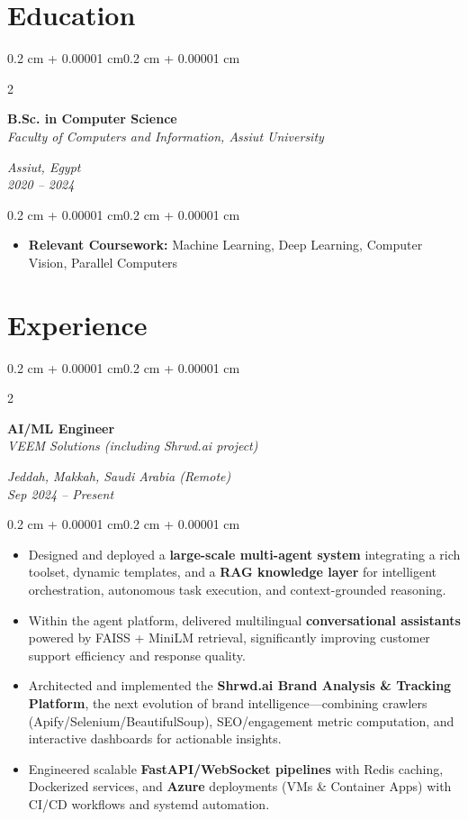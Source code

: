 \documentclass[10pt, letterpaper]{article}
\newenvironment{highlights}{
  \begin{itemize}[
    topsep=0.10 cm,
    parsep=0.10 cm,
    partopsep=0pt,
    itemsep=0pt,
    leftmargin=0.4 cm + 10pt
  ]}
  {\end{itemize}
}
\newenvironment{onecolentry}{
  \begin{adjustwidth}{0.2 cm + 0.00001 cm}{0.2 cm + 0.00001 cm}
}{
  \end{adjustwidth}
}
\newenvironment{twocolentry}[2][]{
  \onecolentry
  \def\secondColumn{#2}
  \setcolumnwidth{\fill, 4.5 cm}
  \begin{paracol}{2}
}{
  \switchcolumn \raggedleft \secondColumn
  \end{paracol}
  \endonecolentry
}
\begin{document}
\section{Education}
\begin{twocolentry}{
  \textit{Assiut, Egypt} \\
  \textit{2020 -- 2024}}
  \textbf{B.Sc. in Computer Science} \\
  \textit{Faculty of Computers and Information, Assiut University}
\end{twocolentry}
\vspace{0.10 cm}
\begin{onecolentry}
  \begin{highlights}
    \item \textbf{Relevant Coursework:} Machine Learning, Deep Learning, Computer Vision, Parallel Computers
  \end{highlights}
\end{onecolentry}

\section{Experience}

\begin{twocolentry}{
  \textit{Jeddah, Makkah, Saudi Arabia (Remote)} \\
  \textit{Sep 2024 -- Present}}
  \textbf{AI/ML Engineer} \\
  \textit{VEEM Solutions (including Shrwd.ai project)}
\end{twocolentry}
\vspace{0.10 cm}
\begin{onecolentry}
  \begin{highlights}
    \item Designed and deployed a \textbf{large-scale multi-agent system} integrating a rich toolset, dynamic templates, and a \textbf{RAG knowledge layer} for intelligent orchestration, autonomous task execution, and context-grounded reasoning.
    \item Within the agent platform, delivered multilingual \textbf{conversational assistants} powered by FAISS + MiniLM retrieval, significantly improving customer support efficiency and response quality.
    \item Architected and implemented the \textbf{Shrwd.ai Brand Analysis \& Tracking Platform}, the next evolution of brand intelligence—combining crawlers (Apify/Selenium/BeautifulSoup), SEO/engagement metric computation, and interactive dashboards for actionable insights.
    \item Engineered scalable \textbf{FastAPI/WebSocket pipelines} with Redis caching, Dockerized services, and \textbf{Azure} deployments (VMs \& Container Apps) with CI/CD workflows and systemd automation.
  \end{highlights}
\end{onecolentry}
\end{document}
